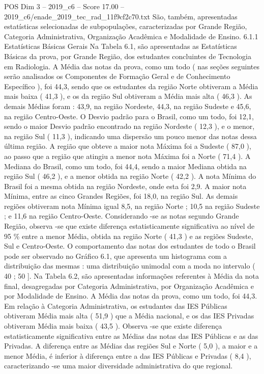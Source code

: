 \begin{textsample}{POS Dim 3 – 2019\_c6 – Score 17.00 – 2019\_c6/enade\_2019\_tec\_rad\_11f9cf2c70.txt}
São, também, apresentadas estatísticas selecionadas de subpopulações, caracterizadas por Grande Região, Categoria Administrativa, Organização Acadêmica e Modalidade de Ensino. 6.1.1 Estatísticas Básicas Gerais Na Tabela 6.1, são apresentadas as Estatísticas Básicas da prova, por Grande Região, dos estudantes concluintes de Tecnologia em Radiologia.
A Média das notas da prova, como um todo ( nas seções seguintes serão analisados os Componentes de Formação Geral e de Conhecimento Específico ), foi 44,3, sendo que os estudantes da região Norte obtiveram a Média mais baixa ( 41,3 ), e os da região Sul obtiveram a Média mais alta ( 46,3 ).
As demais Médias foram : 43,9, na região Nordeste, 44,3, na região Sudeste e 45,6, na região Centro-Oeste.
O Desvio padrão para o Brasil, como um todo, foi 12,1, sendo o maior Desvio padrão encontrado na região Nordeste ( 12,3 ), e o menor, na região Sul ( 11,3 ), indicando uma dispersão um pouco menor das notas dessa última região.
A região que obteve a maior nota Máxima foi a Sudeste ( 87,0 ), ao passo que a região que atingiu a menor nota Máxima foi a Norte ( 71,4 ).
A Mediana do Brasil, como um todo, foi 44,4, sendo a maior Mediana obtida na região Sul ( 46,2 ), e a menor obtida na região Norte ( 42,2 ).
A nota Mínima do Brasil foi a mesma obtida na região Nordeste, onde esta foi 2,9.
A maior nota Mínima, entre as cinco Grandes Regiões, foi 18,0, na região Sul.
As demais regiões obtiveram nota Mínima igual 8,5, na região Norte ; 10,5 na região Sudeste ; e 11,6 na região Centro-Oeste.
Considerando -se as notas segundo Grande Região, observa -se que existe diferença estatisticamente significativa ao nível de 95 \% entre a menor Média, obtida na região Norte ( 41,3 ) e as regiões Sudeste, Sul e Centro-Oeste.
O comportamento das notas dos estudantes de todo o Brasil pode ser observado no Gráfico 6.1, que apresenta um histograma com a distribuição das mesmas : uma distribuição unimodal com a moda no intervalo ( 40 ; 50 ].
Na Tabela 6.2, são apresentadas informações referentes à Média da nota final, desagregadas por Categoria Administrativa, por Organização Acadêmica e por Modalidade de Ensino.
A Média das notas da prova, como um todo, foi 44,3.
Em relação à Categoria Administrativa, os estudantes das IES Públicas obtiveram Média mais alta ( 51,9 ) que a Média nacional, e os das IES Privadas obtiveram Média mais baixa ( 43,5 ).
Observa -se que existe diferença estatisticamente significativa entre as Médias das notas das IES Públicas e as das Privadas.
A diferença entre as Médias das regiões Sul e Norte ( 5,0 ), a maior e a menor Média, é inferior à diferença entre a das IES Públicas e Privadas ( 8,4 ), caracterizando -se uma maior diversidade administrativa do que regional.

\end{textsample}
